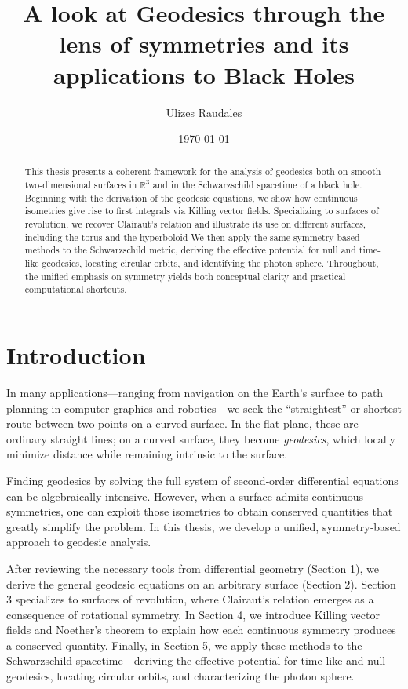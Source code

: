 \documentclass[12pt]{article}
\title{A look at Geodesics through the lens of symmetries and its applications to Black Holes}
\author{Ulizes Raudales}
\date{\today}
\newcommand{\R}{\mathbb{R}}
\begin{document}
\maketitle

\newpage
\tableofcontents
\newpage

\begin{abstract}
	This thesis presents a coherent framework for the analysis of geodesics both on smooth two-dimensional surfaces in \(\R^3\) and in the Schwarzschild spacetime of a black hole.
	Beginning with the derivation of the geodesic equations, we show how continuous isometries give rise to first integrals via Killing vector fields.  
	Specializing to surfaces of revolution, we recover Clairaut's relation and illustrate its use on different surfaces, including the torus and the hyperboloid
	We then apply the same symmetry-based methods to the Schwarzschild metric, deriving the effective potential for null and time-like geodesics, locating circular orbits, and identifying the photon sphere.  
	Throughout, the unified emphasis on symmetry yields both conceptual clarity and practical computational shortcuts.
\end{abstract}

\section{Introduction}

In many applications—ranging from navigation on the Earth’s surface to path planning in computer graphics and robotics—we seek the “straightest” or shortest route between two points on a curved surface.  
In the flat plane, these are ordinary straight lines; on a curved surface, they become \emph{geodesics}, which locally minimize distance while remaining intrinsic to the surface.

Finding geodesics by solving the full system of second‐order differential equations can be algebraically intensive.  
However, when a surface admits continuous symmetries, one can exploit those isometries to obtain conserved quantities that greatly simplify the problem.  
In this thesis, we develop a unified, symmetry‐based approach to geodesic analysis.

After reviewing the necessary tools from differential geometry (Section 1), we derive the general geodesic equations on an arbitrary surface (Section 2).  
Section 3 specializes to surfaces of revolution, where Clairaut’s relation emerges as a consequence of rotational symmetry.  
In Section 4, we introduce Killing vector fields and Noether’s theorem to explain how each continuous symmetry produces a conserved quantity.  
Finally, in Section 5, we apply these methods to the Schwarzschild spacetime—deriving the effective potential for time‐like and null geodesics, locating circular orbits, and characterizing the photon sphere.
\end{document}
